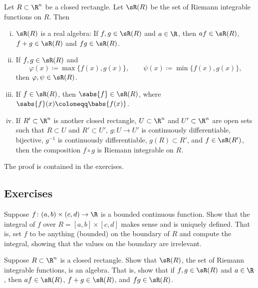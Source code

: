\begin{cor} \label{cor:closednessofriemannintegrable}
\pagebreak[2]
Let $R \subset \R^n$ be a closed rectangle.  Let $\sR(R)$ be the set
of Riemann integrable functions on $R$.  Then
\begin{enumerate}[(i)]
\item
$\sR(R)$ is a real algebra:
If $f,g \in \sR(R)$ and $a \in \R$, then $af \in \sR(R)$, $f+g \in \sR(R)$
and $fg \in \sR(R)$.
\item
If $f,g \in \sR(R)$ and
\begin{equation*}
\varphi(x) \coloneqq \max \bigl\{ f(x) , g(x) \bigr\} ,
\qquad
\psi(x) \coloneqq \min \bigl\{ f(x) , g(x) \bigr\} ,
\end{equation*}
then $\varphi, \psi \in \sR(R)$.
\item
If $f \in \sR(R)$, then $\sabs{f} \in \sR(R)$, where $\sabs{f}(x) \coloneqq
\babs{f(x)}$.
\item
If $R' \subset \R^n$ is another closed rectangle,
$U \subset \R^n$ and $U' \subset \R^n$ are open sets such that
$R \subset U$ and $R' \subset U'$,
$g \colon U \to U'$ is continuously differentiable, bijective,
$g^{-1}$ is continuously differentiable,
$g(R) \subset R'$,
and $f \in \sR(R')$,
then the composition $f \circ g$ is Riemann integrable on $R$.
\end{enumerate}
\end{cor}

The proof is contained in the exercises.

\subsection{Exercises}

\begin{exercise}
Suppose $f \colon (a,b) \times (c,d) \to \R$ is a bounded continuous
function.  Show that the integral of $f$ over $R = [a,b] \times [c,d]$ makes sense
and is uniquely defined.  That is, set $f$ to be anything (bounded) on the boundary of
$R$ and compute the integral, showing that the values on the boundary are
irrelevant.
\end{exercise}

\begin{exercise}
Suppose $R \subset \R^n$ is a closed rectangle.  Show that $\sR(R)$, the set
of Riemann integrable functions, is an algebra.  That is, show that
if $f,g \in \sR(R)$ and $a \in \R$, then $af \in \sR(R)$, $f+g \in \sR(R)$,
and $fg \in \sR(R)$.
\end{exercise}

